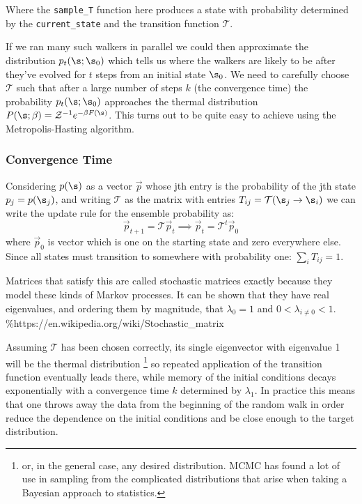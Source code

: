 Where the \texttt{sample\_T} function here produces a state with probability determined by the \texttt{current\_state} and the transition function \(\mathcal{T}\).

If we ran many such walkers in parallel we could then approximate the distribution \(p_t(\s; \s_0)\) which tells us where the walkers are likely to be after they've evolved for \(t\) steps from an initial state \(\s_0\). We need to carefully choose \(\mathcal{T}\) such that after a large number of steps \(k\) (the convergence time) the probability \(p_t(\s;\s_0)\) approaches the thermal distribution \(P(\s; \beta) = \mathcal{Z}^{-1} e^{-\beta F(\s)}\). This turns out to be quite easy to achieve using the Metropolis-Hasting algorithm.

\hypertarget{convergence-time}{%
\subsubsection{Convergence Time}\label{convergence-time}}

Considering \(p(\s)\) as a vector \(\vec{p}\) whose jth entry is the probability of the jth state \(p_j = p(\s_j)\), and writing \(\mathcal{T}\) as the matrix with entries \(T_{ij} = \mathcal{T}(\s_j \rightarrow \s_i)\) we can write the update rule for the ensemble probability as: \[\vec{p}_{t+1} = \mathcal{T} \vec{p}_t \implies \vec{p}_{t} = \mathcal{T}^t \vec{p}_0\] where \(\vec{p}_0\) is vector which is one on the starting state and zero everywhere else. Since all states must transition to somewhere with probability one: \(\sum_i T_{ij} = 1\).

Matrices that satisfy this are called stochastic matrices exactly because they model these kinds of Markov processes. It can be shown that they have real eigenvalues, and ordering them by magnitude, that \(\lambda_0 = 1\) and \(0 < \lambda_{i\neq0} < 1\). \%https://en.wikipedia.org/wiki/Stochastic\_matrix

Assuming \(\mathcal{T}\) has been chosen correctly, its single eigenvector with eigenvalue 1 will be the thermal distribution \footnote{or, in the general case, any desired distribution. MCMC has found a lot of use in sampling from the complicated distributions that arise when taking a Bayesian approach to statistics.} so repeated application of the transition function eventually leads there, while memory of the initial conditions decays exponentially with a convergence time \(k\) determined by \(\lambda_1\). In practice this means that one throws away the data from the beginning of the random walk in order reduce the dependence on the initial conditions and be close enough to the target distribution.

